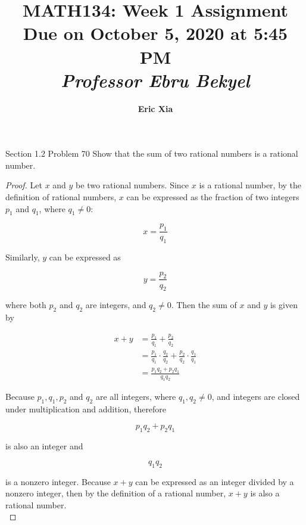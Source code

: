 \documentclass{article}
\title{
    \vspace{2in}
    \textmd{\textbf{MATH134: Week 1 Assignment}}\\
    \normalsize\vspace{0.1in}\small{Due on October 5, 2020 at 5:45 PM}\\
    \vspace{0.1in}\large{\textit{Professor Ebru Bekyel}}
    \vspace{3in}
}
\author{\textbf{Eric Xia}}
\date{}
\begin{document}
    \maketitle
    \pagebreak


    \thispagestyle{page2}
    \begin{tbhtheorem}{Section 1.2 Problem 70}
        Show that the sum of two rational numbers is a rational number.
    \end{tbhtheorem}

    \begin{proof}
    \noindent Let $x$ and $y$ be two rational numbers. Since $x$ is a rational number, by the definition of rational numbers, $x$ can be expressed as the fraction of two integers $p_1$ and $q_1$, where $q_1 \not = 0$:

    \begin{equation*}
        x = \frac{p_1}{q_1}
    \end{equation*}

    \noindent Similarly, $y$ can be expressed as

    \begin{equation*}
        y = \frac{p_2}{q_2}
    \end{equation*}

    \noindent where both $p_2$ and $q_2$ are integers, and $q_2 \not = 0$. Then the sum of $x$ and $y$ is given by

    \begin{align*}
        x + y   &= \frac{p_1}{q_1} + \frac{p_2}{q_2} \\
                &= \frac{p_1}{q_1}\cdot \frac{q_2}{q_2} + \frac{p_2}{q_2} \cdot \frac{q_1}{q_1} \\
                &= \frac{p_1 q_2 + p_2 q_1}{q_1 q_2}
    \end{align*}

    \noindent Because $p_1,q_1,p_2$ and $q_2$ are all integers, where $q_1,q_2 \not = 0$, and integers are closed under multiplication and addition, therefore

    \[
        p_1 q_2 + p_2 q_1
    \]

    \noindent is also an integer and

    \[
        q_1 q_2
    \]

    \noindent is a nonzero integer. Because $x+y$ can be expressed as an integer divided by a nonzero integer, then by the definition of a rational number, $x+y$ is also a rational number. \\
    \end{proof}
\end{document}
